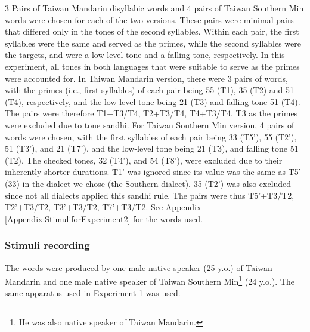 3 Pairs of Taiwan Mandarin disyllabic words and 4 pairs of Taiwan Southern Min words were chosen for each of the two versions. These pairs were minimal pairs that differed only in the tones of the second syllables. Within each pair, the first syllables were the same and served as the primes, while the second syllables were the targets, and were a low-level tone and a falling tone, respectively. In this experiment, all tones in both languages that were suitable to serve as the primes were accounted for. In Taiwan Mandarin version, there were 3 pairs of words, with the primes (i.e., first syllables) of each pair being 55 (T1), 35 (T2) and 51 (T4), respectively, and the low-level tone being 21 (T3) and falling tone 51 (T4). The pairs were therefore T1+T3/T4, T2+T3/T4, T4+T3/T4. T3 as the primes were excluded due to tone sandhi. For Taiwan Southern Min version, 4 pairs of words were chosen, with the first syllables of each pair being 33 (T5'), 55 (T2'), 51 (T3'), and 21 (T7'), and the low-level tone being 21 (T3), and falling tone 51 (T2). The checked tones, 32 (T4'), and 54 (T8'), were excluded due to their inherently shorter durations. T1' was ignored since its value was the same as T5' (33) in the dialect we chose (the Southern dialect). 35 (T2') was also excluded since not all dialects applied this sandhi rule. The pairs were thus T5'+T3/T2, T2'+T3/T2, T3'+T3/T2, T7'+T3/T2. See Appendix \ref{Appendix:StimuliforExperiment2} for the words used.

\subsubsection{Stimuli recording}
The words were produced by one male native speaker (25 y.o.) of Taiwan Mandarin and one male native speaker of Taiwan Southern Min\footnote{He was also native speaker of Taiwan Mandarin.} (24 y.o.). The same apparatus used in Experiment 1 was used.

